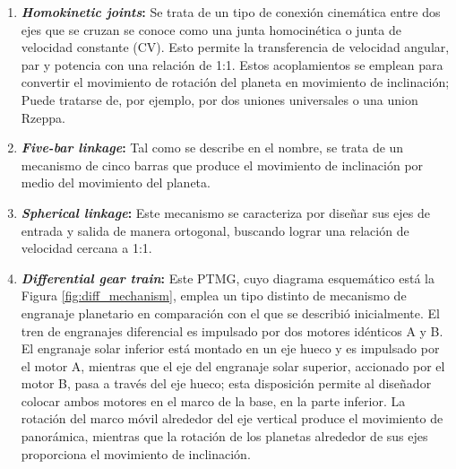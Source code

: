 \begin{enumerate}[label=\alph*)]
\begin{enumerate}[label=\Roman*)]
    \item \textbf{\textit{Homokinetic joints}:} Se trata de un tipo de conexión cinemática entre dos ejes que se cruzan se conoce como una junta homocinética o junta de velocidad constante (CV). Esto permite la transferencia de velocidad angular, par y potencia con una relación de 1:1. Estos acoplamientos se emplean para convertir el movimiento de rotación del planeta en movimiento de inclinación; Puede tratarse de, por ejemplo, por dos uniones universales o una union Rzeppa.
    
    \item \textbf{\textit{Five-bar linkage}:} Tal como se describe en el nombre, se trata de un mecanismo de cinco barras que produce el movimiento de inclinación por medio del movimiento del planeta.
    
    \item \textbf{\textit{Spherical linkage}:} Este mecanismo se caracteriza por diseñar sus ejes de entrada y salida de manera ortogonal, buscando lograr una relación de velocidad cercana a 1:1.
    
    \item \textbf{\textit{Differential gear train}:} Este PTMG, cuyo diagrama esquemático está la Figura \ref{fig:diff_mechanism}, emplea un tipo distinto de mecanismo de engranaje planetario en comparación con el que se describió inicialmente. El tren de engranajes diferencial es impulsado por dos motores idénticos A y B. El engranaje solar inferior está montado en un eje hueco y es impulsado por el motor A, mientras que el eje del engranaje solar superior, accionado por el motor B, pasa a través del eje hueco; esta disposición permite al diseñador colocar ambos motores en el marco de la base, en la parte inferior. La rotación del marco móvil alrededor del eje vertical produce el movimiento de panorámica, mientras que la rotación de los planetas alrededor de sus ejes proporciona el movimiento de inclinación.


\end{enumerate}
\end{enumerate}
